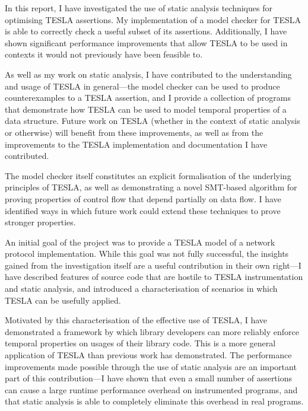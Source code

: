 In this report, I have investigated the use of static analysis techniques for
optimising TESLA assertions. My implementation of a model checker for TESLA is
able to correctly check a useful subset of its assertions. Additionally, I have
shown significant performance improvements that allow TESLA to be used in
contexts it would not previously have been feasible to.

As well as my work on static analysis, I have contributed to the understanding
and usage of TESLA in general---the model checker can be used to produce
counterexamples to a TESLA assertion, and I provide a collection of programs
that demonstrate how TESLA can be used to model temporal properties of a data
structure. Future work on TESLA (whether in the context of static analysis or
otherwise) will benefit from these improvements, as well as from the
improvements to the TESLA implementation and documentation I have contributed.

The model checker itself constitutes an explicit formalisation of the underlying
principles of TESLA, as well as demonstrating a novel SMT-based algorithm for
proving properties of control flow that depend partially on data flow. I have
identified ways in which future work could extend these techniques to prove
stronger properties.

An initial goal of the project was to provide a TESLA model of a network
protocol implementation. While this goal was not fully successful, the insights
gained from the investigation itself are a useful contribution in their own
right---I have described features of source code that are hostile to TESLA
instrumentation and static analysis, and introduced a characterisation of
scenarios in which TESLA can be usefully applied.

Motivated by this characterisation of the effective use of TESLA, I have
demonstrated a framework by which library developers can more reliably enforce
temporal properties on usages of their library code. This is a more general
application of TESLA than previous work has demonstrated. The performance
improvements made possible through the use of static analysis are an important
part of this contribution---I have shown that even a small number of assertions
can cause a large runtime performance overhead on instrumented programs, and
that static analysis is able to completely eliminate this overhead in real
programs.

